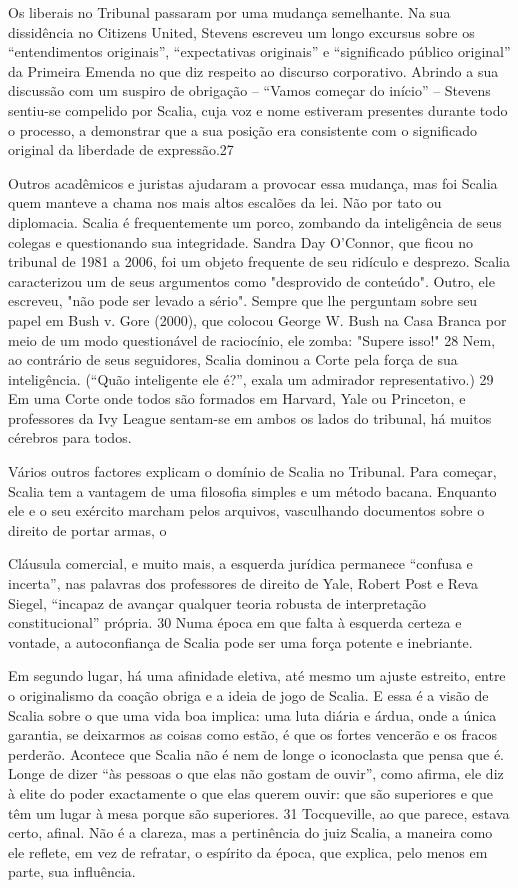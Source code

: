  \par 
Os liberais no Tribunal passaram por uma mudança semelhante. Na sua dissidência no Citizens United, Stevens escreveu um longo excursus sobre os “entendimentos originais”, “expectativas originais” e “significado público original” da Primeira Emenda no que diz respeito ao discurso corporativo. Abrindo a sua discussão com um suspiro de obrigação – “Vamos começar do início” – Stevens sentiu-se compelido por Scalia, cuja voz e nome estiveram presentes durante todo o processo, a demonstrar que a sua posição era consistente com o significado original da liberdade de expressão.{\color{blue}27}
 \par 
Outros acadêmicos e juristas ajudaram a provocar essa mudança, mas foi Scalia quem manteve a chama nos mais altos escalões da lei. Não por tato ou diplomacia. Scalia é frequentemente um porco, zombando da inteligência de seus colegas e questionando sua integridade. Sandra Day O'Connor, que ficou no tribunal de 1981 a 2006, foi um objeto frequente de seu ridículo e desprezo. Scalia caracterizou um de seus argumentos como "desprovido de conteúdo". Outro, ele escreveu, "não pode ser levado a sério". Sempre que lhe perguntam sobre seu papel em Bush v. Gore (2000), que colocou George W. Bush na Casa Branca por meio de um modo questionável de raciocínio, ele zomba: "Supere isso!" {\color{blue}28} Nem, ao contrário de seus seguidores, Scalia dominou a Corte pela força de sua inteligência. (“Quão inteligente ele é?”, exala um admirador representativo.) {\color{blue}29} Em uma Corte onde todos são formados em Harvard, Yale ou Princeton, e professores da Ivy League sentam-se em ambos os lados do tribunal, há muitos cérebros para todos.
 \par 
Vários outros factores explicam o domínio de Scalia no Tribunal. Para começar, Scalia tem a vantagem de uma filosofia simples e um método bacana. Enquanto ele e o seu exército marcham pelos arquivos, vasculhando documentos sobre o direito de portar armas, o
 \par 
Cláusula comercial, e muito mais, a esquerda jurídica permanece “confusa e incerta”, nas palavras dos professores de direito de Yale, Robert Post e Reva Siegel, “incapaz de avançar qualquer teoria robusta de interpretação constitucional” própria. {\color{blue}30} Numa época em que falta à esquerda certeza e vontade, a autoconfiança de Scalia pode ser uma força potente e inebriante.
 \par 
Em segundo lugar, há uma afinidade eletiva, até mesmo um ajuste estreito, entre o originalismo da coação obriga e a ideia de jogo de Scalia. E essa é a visão de Scalia sobre o que uma vida boa implica: uma luta diária e árdua, onde a única garantia, se deixarmos as coisas como estão, é que os fortes vencerão e os fracos perderão. Acontece que Scalia não é nem de longe o iconoclasta que pensa que é. Longe de dizer “às pessoas o que elas não gostam de ouvir”, como afirma, ele diz à elite do poder exactamente o que elas querem ouvir: que são superiores e que têm um lugar à mesa porque são superiores. {\color{blue}31} Tocqueville, ao que parece, estava certo, afinal. Não é a clareza, mas a pertinência do juiz Scalia, a maneira como ele reflete, em vez de refratar, o espírito da época, que explica, pelo menos em parte, sua influência.

